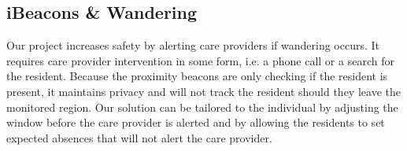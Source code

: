 \documentclass[11pt]{article}
\begin{document}
\subsection{iBeacons \& Wandering}
Our project increases safety by alerting care providers if wandering occurs. It requires care provider intervention in some form, i.e. a phone call or a search for the resident. Because the proximity beacons are only checking if the resident is present, it maintains privacy and will not track the resident should they leave the monitored region. Our solution can be tailored to the individual by adjusting the window before the care provider is alerted and by allowing the residents to set expected absences that will not alert the care provider. 
 


\printbibliography
\end{document}
